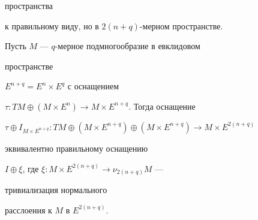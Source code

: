 пространства 


к правильному виду, но в $2(n+q)$-мерном пространстве. 


 


\begin{lem} Пусть $M$ --- $q$-мерное подмногообразие в евклидовом 


пространстве 


$E^{n+q}=E^n\times E^q$ с оснащением 


$\tau:TM\oplus(M\times E^n)\to M\times E^{n+q}$. Тогда оснащение 


$\tau\oplus I_{M\times E^{n+q}}:TM\oplus(M\times E^{n+q}) 


\oplus(M\times E^{n+q})\to M\times E^{2(n+q)}$ 


эквивалентно правильному оснащению 


$I\oplus\xi$, где $\xi:M\times E^{2(n+q)}\to\nu_{2(n+q)}M$ --- 


тривиализация нормального 


расслоения к $M$ в $E^{2(n+q)}$. 


\end{lem} 


 


